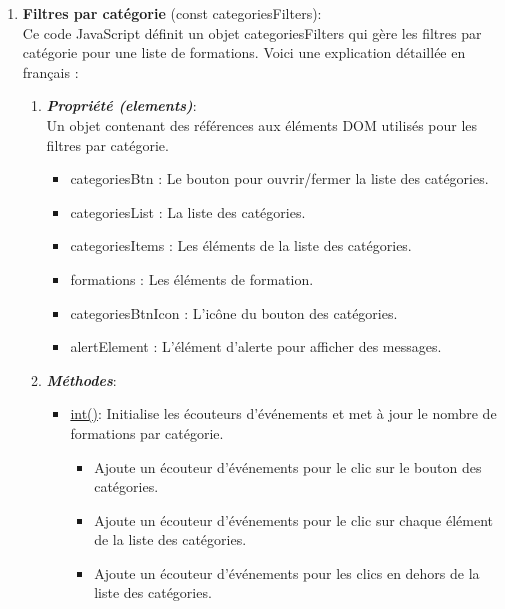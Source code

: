\documentclass[a4paper,11pt]{article}
\begin{document}
\begin{enumerate}
                \bigskip
                \item \textbf{Filtres par catégorie} (const categoriesFilters): \\
                    
                \noindent Ce code JavaScript définit un objet categoriesFilters qui gère les filtres par catégorie pour une liste de formations. Voici une explication détaillée en français :
                    \begin{enumerate} 
                        \item \textbf{\textit{Propriété (elements)}}: \\ 
                            \noindent Un objet contenant des références aux éléments DOM utilisés pour les filtres par catégorie.
                            \begin{itemize}
                                \item categoriesBtn : Le bouton pour ouvrir/fermer la liste des catégories.
                                \item categoriesList : La liste des catégories.
                                \item categoriesItems : Les éléments de la liste des catégories.
                                \item formations : Les éléments de formation.
                                \item categoriesBtnIcon : L'icône du bouton des catégories.
                                \item alertElement : L'élément d'alerte pour afficher des messages.
                            \end{itemize}

                        \item \textbf{\textit{Méthodes}}: 
                            \begin{itemize}
                                \item \underline{int()}:  Initialise les écouteurs d'événements et met à jour le nombre de formations par catégorie.
                                    \begin{itemize}
                                        \item Ajoute un écouteur d'événements pour le clic sur le bouton des catégories.
                                        \item Ajoute un écouteur d'événements pour le clic sur chaque élément de la liste des catégories.
                                        \item Ajoute un écouteur d'événements pour les clics en dehors de la liste des catégories.
                                    \end{itemize}


\end{itemize}
\end{enumerate}
\end{enumerate}
\end{document}
